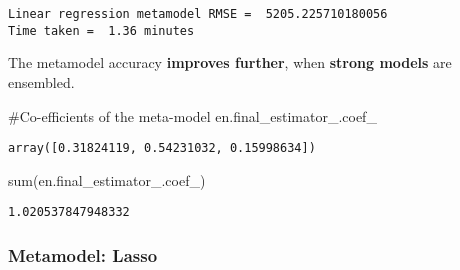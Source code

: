\documentclass[
  letterpaper,
  DIV=11,
  numbers=noendperiod]{scrreprt}
\newenvironment{Shaded}{\begin{snugshade}}{\end{snugshade}}
\newcommand{\BuiltInTok}[1]{\textcolor[rgb]{0.00,0.23,0.31}{#1}}
\newcommand{\CommentTok}[1]{\textcolor[rgb]{0.37,0.37,0.37}{#1}}
\newcommand{\NormalTok}[1]{\textcolor[rgb]{0.00,0.23,0.31}{#1}}
\begin{document}
\begin{verbatim}
Linear regression metamodel RMSE =  5205.225710180056
Time taken =  1.36 minutes
\end{verbatim}

The metamodel accuracy \textbf{improves further}, when \textbf{strong
models} are ensembled.

\begin{Shaded}
\begin{Highlighting}[]
\CommentTok{\#Co{-}efficients of the meta{-}model}
\NormalTok{en.final\_estimator\_.coef\_}
\end{Highlighting}
\end{Shaded}

\begin{verbatim}
array([0.31824119, 0.54231032, 0.15998634])
\end{verbatim}

\begin{Shaded}
\begin{Highlighting}[]
\BuiltInTok{sum}\NormalTok{(en.final\_estimator\_.coef\_)}
\end{Highlighting}
\end{Shaded}

\begin{verbatim}
1.020537847948332
\end{verbatim}

\subsubsection{Metamodel: Lasso}\label{metamodel-lasso}
\end{document}
